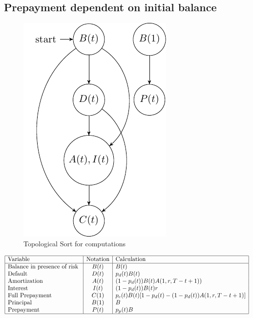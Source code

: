\subsection{Prepayment dependent on initial balance}
\begin{figure}[H]
  \centering
      \includegraphics[width=.3\textwidth]{Graph1.pdf} 
 \caption{Topological Sort for computations}
 \label{fig:Test}
\end{figure}

\begin{center} %
\[ %
\begin{array}{|l|c|l|} \hline %
\mbox{Variable} &\mbox{Notation} & \mbox{Calculation}\\ \hline
\mbox{Balance in presence of risk }  & B(t)  & B(t)\\
\mbox{Default  }  & D(t) & p_d(t) B(t)\\
\mbox{Amortization}  & A(t) &(1-p_d(t)) B(t)A(1,r,T-t+1))\\
\mbox{Interest }  &  I(t) & (1-p_d(t))B(t)r\\
\mbox{Full Prepayment}  & C(1) & p_c(t) B(t)[1-p_d(t)-(1-p_d(t))A(1,r,T-t+1)]\\
\mbox{Principal   }  &  B(1) & B\\
\mbox{Prepayment  }  & P(t) & p_p(t)B\\
\hline
\end{array} %
\] %
\end{center}


